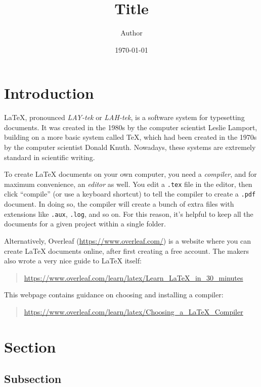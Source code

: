 \documentclass[a4paper,10pt,leqno]{article}
\numberwithin{equation}{section}
\theoremstyle{plain}
\theoremstyle{definition}
\theoremstyle{remark}
\begin{document}
\title{Title}
\author{Author}
\date{\today} %
\maketitle

\thispagestyle{empty}


\section{Introduction}

\LaTeX{}, pronounced \emph{LAY-tek} or \emph{LAH-tek}, is a software system for typesetting documents.
It was created in the 1980s by the computer scientist Leslie Lamport, building on a more basic system called \TeX{}, which had been created in the 1970s by the computer scientist Donald Knuth.
Nowadays, these systems are extremely standard in scientific writing.

To create \LaTeX{} documents on your own computer, you need a \emph{compiler}, and for maximum convenience, an \emph{editor} as well.
You edit a \texttt{.tex} file in the editor, then click ``compile'' (or use a keyboard shortcut) to tell the compiler to create a \texttt{.pdf} document.
In doing so, the compiler will create a bunch of extra files with extensions like \texttt{.aux}, \texttt{.log}, and so on.
For this reason, it's helpful to keep all the documents for a given project within a single folder.

Alternatively, Overleaf (\url{https://www.overleaf.com/}) is a website where you can create \LaTeX{} documents online, after first creating a free account.
The makers also wrote a very nice guide to \LaTeX{} itself:
\begin{quote}  \url{https://www.overleaf.com/learn/latex/Learn_LaTeX_in_30_minutes}
\end{quote}
This webpage contains guidance on choosing and installing a compiler:
\begin{quote}
\url{https://www.overleaf.com/learn/latex/Choosing_a_LaTeX_Compiler}
\end{quote}

\section{Section}

\subsection{Subsection}
\end{document}

